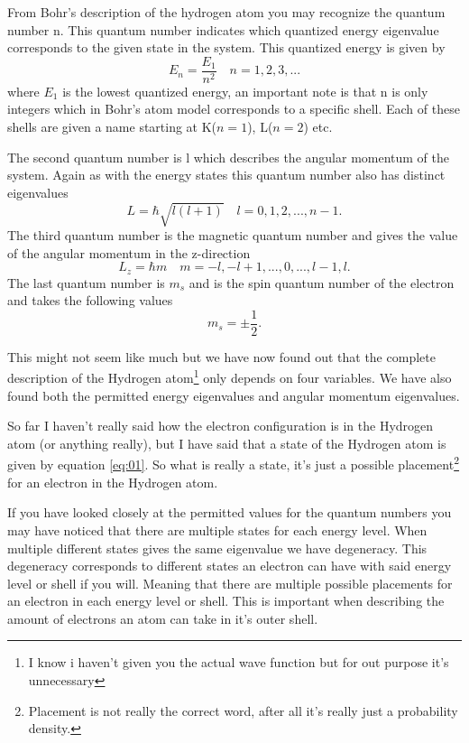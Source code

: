\documentclass[jmp, amsmath, amssymb, reprint]{article}
\numberwithin{equation}{section}
\newcommand{\lp}{\left(}
\newcommand{\rp}{\right)}
\begin{document}
\begin{multicols}{2}
From Bohr's description of the hydrogen atom you may recognize the quantum number n. This quantum number indicates which quantized energy eigenvalue corresponds to the given state in the system. This quantized energy is given by
\begin{equation}
E_n = \frac{E_1}{n^2}\quad n=1,2,3,...
\end{equation}
where \(E_1\) is the lowest quantized energy, an important note is that n is only integers which in Bohr's atom model corresponds to a specific shell. Each of these shells are given a name starting at K(\(n=1\)), L(\(n=2\)) etc.

The second quantum number is l which describes the angular momentum of the system. Again as with the energy states this quantum number also has distinct eigenvalues
\begin{equation}
L = \hbar\sqrt{l\lp l+1\rp} \quad l=0, 1, 2,..., n-1.
\end{equation}
The third quantum number is the magnetic quantum number and gives the value of the angular momentum in the z-direction
\begin{equation}
L_z = \hbar m \quad m=-l, -l+1, ..., 0, ...,l-1, l.
\end{equation}
The last quantum number is $m_s$ and is the spin quantum number of the electron and takes the following values
\begin{equation}
m_s=\pm\frac{1}{2}.
\end{equation}

This might not seem like much but we have now found out that the complete description of the Hydrogen atom\footnote{I know i haven't given you the actual wave function but for out purpose it's unnecessary} only depends on four variables. We have also found both the permitted energy eigenvalues and angular momentum eigenvalues.

So far I haven't really said how the electron configuration is in the Hydrogen atom (or anything really), but I have said that a state of the Hydrogen atom is given by equation \ref{eq:01}. So what is really a state, it's just a possible placement\footnote{Placement is not really the correct word, after all it's really just a probability density.} for an electron in the Hydrogen atom. 

If you have looked closely at the permitted values for the quantum numbers you may have noticed that there are multiple states for each energy level. When multiple different states gives the same eigenvalue we have degeneracy. This degeneracy corresponds to different states an electron can have with said energy level or shell if you will. Meaning that there are multiple possible placements for an electron in each energy level or shell. This is important when describing the amount of electrons an atom can take in it's outer shell.


\end{multicols}
\end{document}
